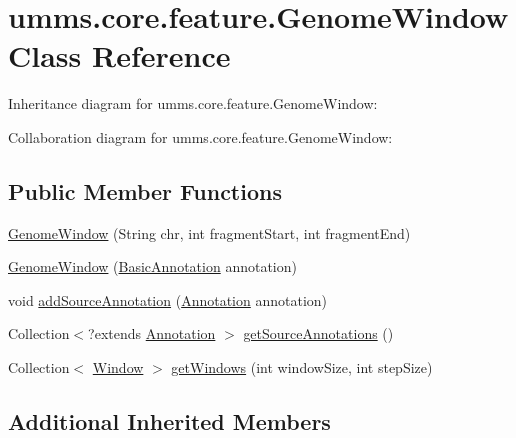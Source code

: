 \hypertarget{classumms_1_1core_1_1feature_1_1_genome_window}{\section{umms.\+core.\+feature.\+Genome\+Window Class Reference}
\label{classumms_1_1core_1_1feature_1_1_genome_window}
}


Inheritance diagram for umms.\+core.\+feature.\+Genome\+Window\+:


Collaboration diagram for umms.\+core.\+feature.\+Genome\+Window\+:
\subsection*{Public Member Functions}
\begin{DoxyCompactItemize}
\item 
\hyperlink{classumms_1_1core_1_1feature_1_1_genome_window_a0801705077c7f6ff230ef4c26515a307}{Genome\+Window} (String chr, int fragment\+Start, int fragment\+End)
\item 
\hyperlink{classumms_1_1core_1_1feature_1_1_genome_window_a8d99ec2475c0475667925fbe83efadfb}{Genome\+Window} (\hyperlink{classumms_1_1core_1_1annotation_1_1_basic_annotation}{Basic\+Annotation} annotation)
\item 
void \hyperlink{classumms_1_1core_1_1feature_1_1_genome_window_abf46dcce062e3fe8596caf393777d8b9}{add\+Source\+Annotation} (\hyperlink{interfaceumms_1_1core_1_1annotation_1_1_annotation}{Annotation} annotation)
\item 
Collection$<$?extends \hyperlink{interfaceumms_1_1core_1_1annotation_1_1_annotation}{Annotation} $>$ \hyperlink{classumms_1_1core_1_1feature_1_1_genome_window_ae2b7673478fa32fd3a28611f0e384b8e}{get\+Source\+Annotations} ()
\item 
Collection$<$ \hyperlink{interfaceumms_1_1core_1_1feature_1_1_window}{Window} $>$ \hyperlink{classumms_1_1core_1_1feature_1_1_genome_window_aa03e0fb867f659eba10ca1144469063d}{get\+Windows} (int window\+Size, int step\+Size)
\end{DoxyCompactItemize}
\subsection*{Additional Inherited Members}


